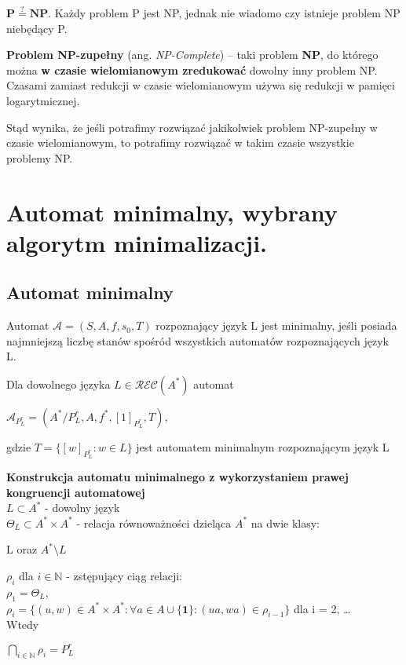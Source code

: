 \documentclass[main.tex]{subfiles}
\begin{document}
    \begin{theorem}
        $\mathbf{P \stackrel{?}{=} NP}$. Każdy problem P jest NP, jednak nie wiadomo czy istnieje problem NP niebędący P.
    \end{theorem}

    \begin{definition}
        \textbf{Problem NP-zupełny} (ang. \textit{NP-Complete}) – taki problem \textbf{NP}, do którego można \textbf{w czasie wielomianowym zredukować} dowolny inny problem NP. Czasami zamiast redukcji w czasie wielomianowym używa się redukcji w pamięci logarytmicznej.
    \end{definition}
    Stąd wynika, że jeśli potrafimy rozwiązać jakikolwiek problem NP-zupełny w czasie wielomianowym,
    to potrafimy rozwiązać w takim czasie wszystkie problemy NP.


    \section{Automat minimalny, wybrany algorytm minimalizacji.}
    \subsection{Automat minimalny}
    \begin{definition}
        Automat $\mathcal{A} = (S, A, f, s_{0}, T)$ rozpoznający język L jest minimalny, jeśli posiada najmniejszą liczbę stanów spośród wszystkich automatów rozpoznających język L.
    \end{definition}

    \begin{definition}
        Dla dowolnego języka $L \in \mathcal{REC}(A^{*})$ automat
        \begin{center}
            $\mathcal{A}_{P_{L}^{r}} = (A^{*} / P_{L}^{r}, A, f^{*}, [1]_{P_{L}^{r}}, T)$,
        \end{center}
        gdzie $T = \{[w]_{P_{L}^{r}} : w \in L \}$ jest automatem minimalnym rozpoznającym język L
    \end{definition}
    \begin{definition}
        \textbf{Konstrukcja automatu minimalnego z wykorzystaniem prawej kongruencji automatowej} \\
        $L \subset A^{*}$ - dowolny język \\
        $\Theta_{L} \subset A^* \times A^*$ - relacja równoważności dzieląca $A^*$ na dwie klasy:
        \begin{center}
            L oraz $A^* \setminus L$
        \end{center}
        $\rho_i$ dla $i \in \mathbb{N}$ - zstępujący ciąg relacji: \\
        $\rho_1 = \Theta_L$, \\
        $\rho_i = \{(u, w) \in A^* \times A^* : \forall a \in A \cup \{\textbf{1}\}: (ua, wa) \in \rho_{i-1} \}$ dla i = 2, \ldots \\
        Wtedy
        \begin{center}
            $\bigcap\limits_{i \in \mathbb{N}} \rho_i = P^r_L$
        \end{center}
    \end{definition}
\end{document}
